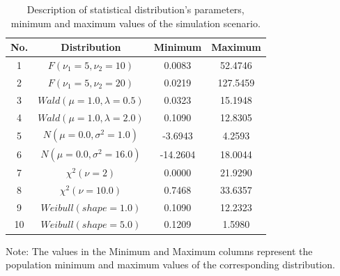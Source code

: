\documentclass[a4paper,fleqn]{cas-dc}
\begin{document}
\begin{table}[htbp]
    \centering
    \caption{Description of statistical distribution's parameters, minimum and maximum values of the 
    simulation scenario.}
    \label{tab:dist-params}
    \begin{threeparttable}
    \begin{tabular}{cccc}
        \toprule
        \textbf{No.} & \textbf{Distribution} & \textbf{Minimum} & \textbf{Maximum} \\
        \midrule
        1 & $F(\nu_1 =5 ,\nu_2 =10)$ & 0.0083 & 52.4746 \\
        \midrule
         2 & $F(\nu_1 =5 ,\nu_2 =20)$ & 0.0219 & 127.5459 \\
         \midrule
         3 & $Wald(\mu =1.0 ,\lambda =0.5)$ & 0.0323 & 15.1948 \\
         \midrule
         4 & $Wald(\mu =1.0 ,\lambda =2.0)$ & 0.1090 & 12.8305 \\
         \midrule
         5 & $N(\mu =0.0 ,\sigma^2 =1.0)$ & -3.6943 & 4.2593 \\
         \midrule
         6 & $N(\mu =0.0 ,\sigma^2 =16.0)$ & -14.2604 & 18.0044 \\
         \midrule 
         7 & $\chi^2(\nu =2)$ & 0.0000 & 21.9290 \\
        \midrule
         8 & $\chi^2(\nu =10.0)$ & 0.7468 & 33.6357 \\
         \midrule
         9 & $Weibull(shape =1.0)$ & 0.1090 & 12.2323 \\
         \midrule
         10 & $Weibull(shape =5.0)$ & 0.1209 & 1.5980 \\
        \bottomrule
    \end{tabular}
    \begin{tablenotes}
          \scriptsize
          \item Note: The values in the Minimum and Maximum columns represent the population minimum and maximum values of the corresponding distribution.
    \end{tablenotes}
    \end{threeparttable}
\end{table}
\end{document}
